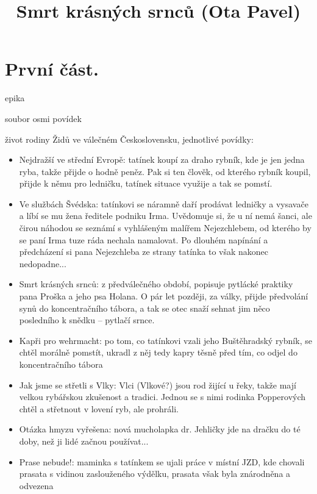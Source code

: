 \documentclass{article}
\title{\vspace{-2cm}Smrt krásných srnců (Ota Pavel)\vspace{-2cm}}
\date{}
\author{}
\begin{document}
\maketitle
\section{První část.}
\begin{description}
    \setlength\itemsep{0.15em}
    \item[druh:] epika
    \item[žánr:] soubor osmi povídek
    \item[téma:] život rodiny Židů ve válečném Československu, jednotlivé povídky:
    \begin{itemize}
    \item Nejdražší ve střední Evropě: tatínek koupí za draho rybník, kde je jen jedna ryba, takže přijde o hodně peněz. Pak si ten člověk, od kterého rybník koupil, přijde k němu pro ledničku, tatínek situace využije a tak se pomstí.
   	\item Ve službách Švédska: tatínkovi se náramně daří prodávat ledničky a vysavače a líbí se mu žena ředitele podniku Irma. Uvědomuje si, že u ní nemá šanci, ale čirou náhodou se seznámí s vyhlášeným malířem Nejezchlebem, od kterého by se paní Irma tuze ráda nechala namalovat. Po dlouhém napínání a předcházení si pana Nejezchleba ze strany tatínka to však nakonec nedopadne...
   	\item Smrt krásných srnců: z předválečného období, popisuje pytlácké praktiky pana Proška a jeho psa Holana. O pár let později, za války, přijde předvolání synů do koncentračního tábora, a tak se otec snaží sehnat jim něco posledního k snědku -- pytlačí srnce.
   	\item Kapři pro wehrmacht: po tom, co tatínkovi vzali jeho Buštěhradský rybník, se chtěl morálně pomstít, ukradl z něj tedy kapry těsně před tím, co odjel do koncentračního tábora
   	\item Jak jsme se střetli s Vlky: Vlci (Vlkové?) jsou rod žijící u řeky, takže mají velkou rybářskou zkušenost a tradici. Jednou se s nimi rodinka Popperových chtěl a střetnout v lovení ryb, ale prohráli.
   	\item Otázka hmyzu vyřešena: nová mucholapka dr. Jehličky jde na dračku do té doby, než ji lidé začnou používat...
   	\item Prase nebude!: maminka s tatínkem se ujali práce v místní JZD, kde chovali prasata s vidinou zaslouženého výdělku, prasata však byla znárodněna a odvezena

\end{itemize}
\end{description}
\end{document}
